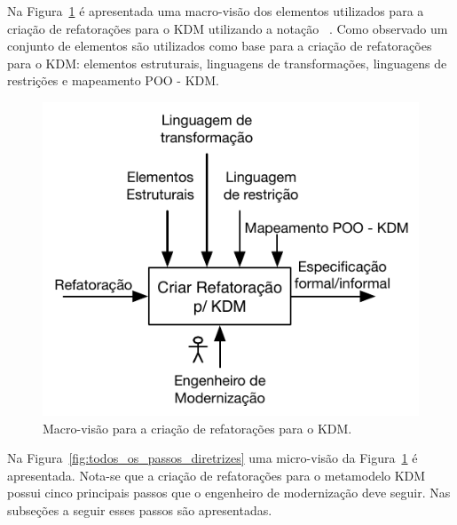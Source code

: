Na Figura~\ref{fig:diretrizes_kdm_refatoracao_capitulo} é apresentada uma macro-visão dos elementos utilizados para a criação de refatorações para o KDM utilizando a notação ~\cite{Marca_1987}. Como observado um conjunto de elementos são utilizados como base para a criação de refatorações para o KDM: elementos estruturais, linguagens de transformações, linguagens de restrições e mapeamento POO - KDM. 

\begin{figure}[h]
	\centering
	\caption{Macro-visão para a criação de refatorações para o KDM.}
	\label{fig:diretrizes_kdm_refatoracao_capitulo}
	\includegraphics[scale=0.9]{images/novoMacroAbordagemKDMRefactoring}
	\fautor
\end{figure}


Na Figura~\ref{fig:todos_os_passos_diretrizes} uma micro-visão da Figura~\ref{fig:diretrizes_kdm_refatoracao_capitulo} é apresentada. Nota-se que a criação de refatorações para o metamodelo KDM possui cinco principais passos que o engenheiro de modernização deve seguir. Nas subseções a seguir esses passos são apresentadas. %


